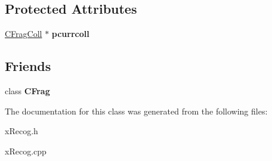 \subsection*{Protected Attributes}
\begin{DoxyCompactItemize}
\item 
\hypertarget{class_cx_recog_adcd953f1d74508391c07c823e53c4750}{\hyperlink{class_c_frag_coll}{C\-Frag\-Coll} $\ast$ {\bfseries pcurrcoll}}\label{class_cx_recog_adcd953f1d74508391c07c823e53c4750}

\end{DoxyCompactItemize}
\subsection*{Friends}
\begin{DoxyCompactItemize}
\item 
\hypertarget{class_cx_recog_a8c98dd49caae786a1db43654fe516506}{class {\bfseries C\-Frag}}\label{class_cx_recog_a8c98dd49caae786a1db43654fe516506}

\end{DoxyCompactItemize}


The documentation for this class was generated from the following files\-:\begin{DoxyCompactItemize}
\item 
x\-Recog.\-h\item 
x\-Recog.\-cpp\end{DoxyCompactItemize}
